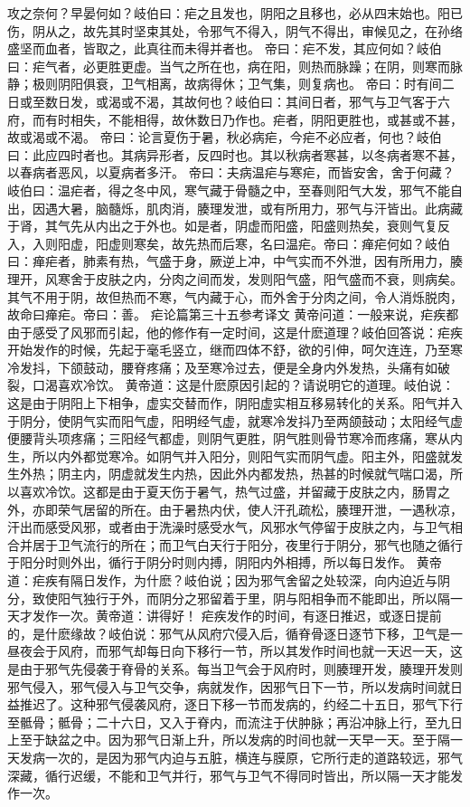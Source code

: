 \documentclass[a4paper,12pt,UTF8,twoside]{ctexbook}
\begin{document}
攻之奈何？早晏何如？岐伯曰：疟之且发也，阴阳之且移也，必从四末始也。阳已伤，阴从之，故先其时坚束其处，令邪气不得入，阴气不得出，审候见之，在孙络盛坚而血者，皆取之，此真往而未得并者也。
帝曰：疟不发，其应何如？岐伯曰：疟气者，必更胜更虚。当气之所在也，病在阳，则热而脉躁；在阴，则寒而脉静；极则阴阳俱衰，卫气相离，故病得休；卫气集，则复病也。
帝曰：时有间二日或至数日发，或渴或不渴，其故何也？岐伯曰：其间日者，邪气与卫气客于六府，而有时相失，不能相得，故休数日乃作也。疟者，阴阳更胜也，或甚或不甚，故或渴或不渴。
帝曰：论言夏伤于暑，秋必病疟，今疟不必应者，何也？岐伯曰：此应四时者也。其病异形者，反四时也。其以秋病者寒甚，以冬病者寒不甚，以春病者恶风，以夏病者多汗。
帝曰：夫病温疟与寒疟，而皆安舍，舍于何藏？岐伯曰：温疟者，得之冬中风，寒气藏于骨髓之中，至春则阳气大发，邪气不能自出，因遇大暑，脑髓烁，肌肉消，腠理发泄，或有所用力，邪气与汗皆出。此病藏于肾，其气先从内出之于外也。如是者，阴虚而阳盛，阳盛则热矣，衰则气复反入，入则阳虚，阳虚则寒矣，故先热而后寒，名曰温疟。帝曰：瘅疟何如？岐伯曰：瘅疟者，肺素有热，气盛于身，厥逆上冲，中气实而不外泄，因有所用力，腠理开，风寒舍于皮肤之内，分肉之间而发，发则阳气盛，阳气盛而不衰，则病矣。其气不用于阴，故但热而不寒，气内藏于心，而外舍于分肉之间，令人消烁脱肉，故命曰瘅疟。帝曰：善。
疟论篇第三十五参考译文
黄帝问道：一般来说，疟疾都由于感受了风邪而引起，他的修作有一定时间，这是什麽道理？岐伯回答说：疟疾开始发作的时候，先起于毫毛竖立，继而四体不舒，欲的引伸，呵欠连连，乃至寒冷发抖，下颌鼓动，腰脊疼痛；及至寒冷过去，便是全身内外发热，头痛有如破裂，口渴喜欢冷饮。
黄帝道：这是什麽原因引起的？请说明它的道理。岐伯说：这是由于阴阳上下相争，虚实交替而作，阴阳虚实相互移易转化的关系。阳气并入于阴分，使阴气实而阳气虚，阳明经气虚，就寒冷发抖乃至两颌鼓动；太阳经气虚便腰背头项疼痛；三阳经气都虚，则阴气更胜，阴气胜则骨节寒冷而疼痛，寒从内生，所以内外都觉寒冷。如阴气并入阳分，则阳气实而阴气虚。阳主外，阳盛就发生外热；阴主内，阴虚就发生内热，因此外内都发热，热甚的时候就气喘口渴，所以喜欢冷饮。这都是由于夏天伤于暑气，热气过盛，并留藏于皮肤之内，肠胃之外，亦即荣气居留的所在。由于暑热内伏，使人汗孔疏松，腠理开泄，一遇秋凉，汗出而感受风邪，或者由于洗澡时感受水气，风邪水气停留于皮肤之内，与卫气相合并居于卫气流行的所在；而卫气白天行于阳分，夜里行于阴分，邪气也随之循行于阳分时则外出，循行于阴分时则内搏，阴阳内外相搏，所以每日发作。
黄帝道：疟疾有隔日发作，为什麽？岐伯说；因为邪气舍留之处较深，向内迫近与阴分，致使阳气独行于外，而阴分之邪留着于里，阴与阳相争而不能即出，所以隔一天才发作一次。黄帝道：讲得好！
疟疾发作的时间，有逐日推迟，或逐日提前的，是什麽缘故？岐伯说：邪气从风府穴侵入后，循脊骨逐日逐节下移，卫气是一昼夜会于风府，而邪气却每日向下移行一节，所以其发作时间也就一天迟一天，这是由于邪气先侵袭于脊骨的关系。每当卫气会于风府时，则腠理开发，腠理开发则邪气侵入，邪气侵入与卫气交争，病就发作，因邪气日下一节，所以发病时间就日益推迟了。这种邪气侵袭风府，逐日下移一节而发病的，约经二十五日，邪气下行至骶骨；骶骨；二十六日，又入于脊内，而流注于伏肿脉；再沿冲脉上行，至九日上至于缺盆之中。因为邪气日渐上升，所以发病的时间也就一天早一天。至于隔一天发病一次的，是因为邪气内迫与五脏，横连与膜原，它所行走的道路较远，邪气深藏，循行迟缓，不能和卫气并行，邪气与卫气不得同时皆出，所以隔一天才能发作一次。
\end{document}
